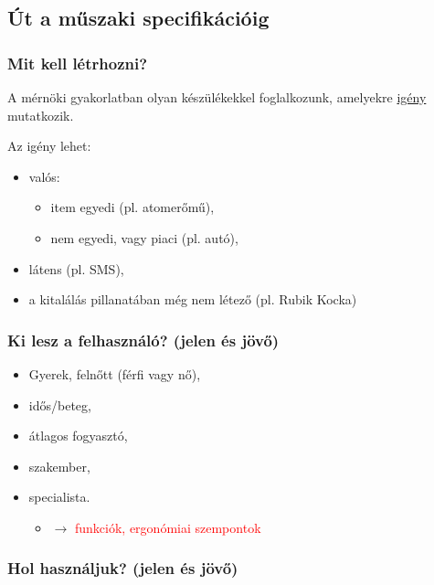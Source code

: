 \documentclass[11pt]{article}
\begin{document}
		\subsection{Út a műszaki specifikációig}
			
			\subsubsection{Mit kell létrhozni?}

				A mérnöki gyakorlatban olyan készülékekkel foglalkozunk, amelyekre \underline{igény} mutatkozik.

				Az igény lehet:

				\begin{itemize}
					\item valós:
					\begin{itemize}
						\item item egyedi (pl. atomerőmű),
						\item nem egyedi, vagy piaci (pl. autó), 
					\end{itemize}
					\item látens (pl. SMS),
					\item a kitalálás pillanatában még nem létező (pl. Rubik Kocka)
				\end{itemize}

			\subsubsection{Ki lesz a felhasználó? (jelen és jövő)}

				\begin{itemize}
					\item Gyerek, felnőtt (férfi vagy nő),
					\item idős/beteg,
					\item átlagos fogyasztó,
					\item szakember,
					\item specialista.
					\begin{itemize}
						\item $\rightarrow$ \textcolor{red}{funkciók, ergonómiai szempontok}
					\end{itemize}
				\end{itemize}

			\subsubsection{Hol használjuk? (jelen és jövő)}
\end{document}

